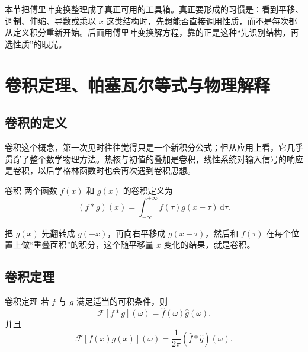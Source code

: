 \begin{tishi}[本节小结]
本节把傅里叶变换整理成了真正可用的工具箱。真正要形成的习惯是：看到平移、调制、伸缩、导数或乘以 $x$ 这类结构时，先想能否直接调用性质，而不是每次都从定义积分重新开始。后面用傅里叶变换解方程，靠的正是这种``先识别结构，再选性质''的眼光。
\end{tishi}

\section{卷积定理、帕塞瓦尔等式与物理解释}

\subsection{卷积的定义}

卷积这个概念，第一次见时往往觉得只是一个新积分公式；但从应用上看，它几乎贯穿了整个数学物理方法。热核与初值的叠加是卷积，线性系统对输入信号的响应是卷积，以后学格林函数时也会再次遇到卷积思想。

\begin{dingliyi}{卷积}{}
两个函数 $f(x)$ 和 $g(x)$ 的卷积定义为
\begin{equation}
    (f*g)(x)=\int_{-\infty}^{+\infty} f(\tau)g(x-\tau)\,\mathrm{d}\tau.
\end{equation}
\end{dingliyi}

\begin{tishi}[怎样直观理解卷积]
把 $g(x)$ 先翻转成 $g(-x)$，再向右平移成 $g(x-\tau)$，然后和 $f(\tau)$ 在每个位置上做``重叠面积''的积分，这个随平移量 $x$ 变化的结果，就是卷积。
\end{tishi}

\subsection{卷积定理}

\begin{dingli}{卷积定理}{}
若 $f$ 与 $g$ 满足适当的可积条件，则
\begin{equation}
    \mathcal{F}[f*g](\omega)=\hat{f}(\omega)\hat{g}(\omega).
\end{equation}
并且
\begin{equation}
    \mathcal{F}[f(x)g(x)](\omega)=\frac{1}{2\pi}(\hat{f}*\hat{g})(\omega).
\end{equation}
\end{dingli}

